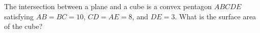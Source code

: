 The intersection between a plane and a cube is a convex pentagon $ABCDE$ satisfying $AB = BC = 10$, $CD = AE = 8$, and $DE = 3$. What is the surface area of the cube?
